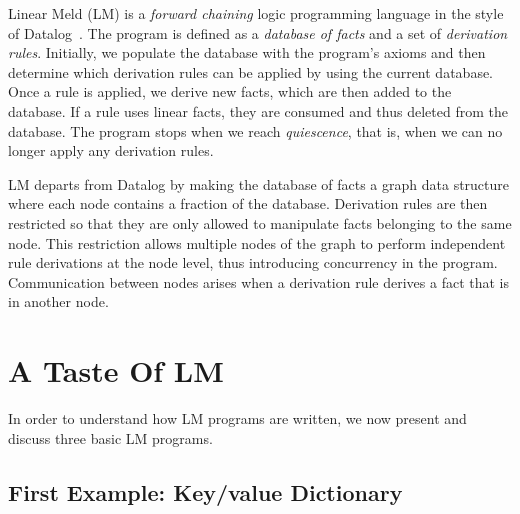 
Linear Meld (LM) is a \emph{forward chaining} logic programming language in the
style of Datalog~\cite{Ullman:1990:PDK:533142}. The program is defined as a
\emph{database of facts} and a set of \emph{derivation rules}.  Initially, we
populate the database with the program's axioms and then determine which
derivation rules can be applied by using the current database. Once a rule is
applied, we derive new facts, which are then added to the database.  If a rule
uses linear facts, they are consumed and thus deleted from the database.  The
program stops when we reach \emph{quiescence}, that is, when we can no longer
apply any derivation rules.

LM departs from Datalog by making the database of facts a graph data structure
where each node contains a fraction of the database. Derivation rules are then
restricted so that they are only allowed to manipulate facts belonging to the
same node. This restriction allows multiple nodes of the graph to perform
independent rule derivations at the node level, thus introducing concurrency in
the program. Communication between nodes arises when a derivation rule derives a
fact that is in another node.

\section{A Taste Of LM}

In order to understand how LM programs are written, we now present and discuss
three basic LM programs.

\subsection{First Example: Key/value Dictionary}

